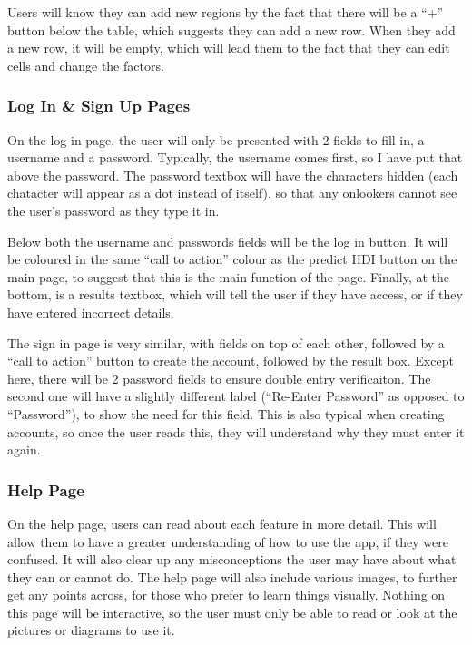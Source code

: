 \documentclass[12pt]{report}
\begin{document}
Users will know they can add new regions by the fact that there will be a ``+'' button below the table, which suggests they can add a new row. When they add a new row, it will be empty, which will lead them to the fact that they can edit cells and change the factors.

\subsubsection{Log In \& Sign Up Pages}
On the log in page, the user will only be presented with 2 fields to fill in, a username and a password. Typically, the username comes first, so I have put that above the password. The password textbox will have the characters hidden (each chatacter will appear as a dot instead of itself), so that any onlookers cannot see the user's password as they type it in.

Below both the username and passwords fields will be the log in button. It will be coloured in the same ``call to action'' colour as the predict HDI button on the main page, to suggest that this is the main function of the page. Finally, at the bottom, is a results textbox, which will tell the user if they have access, or if they have entered incorrect details.

The sign in page is very similar, with fields on top of each other, followed by a ``call to action'' button to create the account, followed by the result box. Except here, there will be 2 password fields to ensure double entry verificaiton. The second one will have a slightly different label (``Re-Enter Password'' as opposed to ``Password''), to show the need for this field. This is also typical when creating accounts, so once the user reads this, they will understand why they must enter it again.

\subsubsection{Help Page}
On the help page, users can read about each feature in more detail. This will allow them to have a greater understanding of how to use the app, if they were confused. It will also clear up any misconceptions the user may have about what they can or cannot do. The help page will also include various images, to further get any points across, for those who prefer to learn things visually. Nothing on this page will be interactive, so the user must only be able to read or look at the pictures or diagrams to use it.
\end{document}
